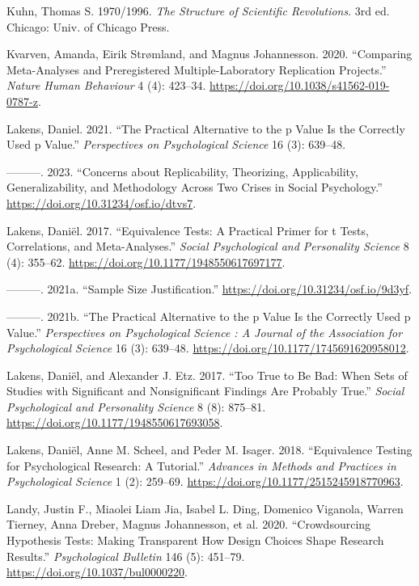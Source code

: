 \documentclass[
  letterpaper,
  DIV=11,
  numbers=noendperiod]{scrreprt}
\newlength{\cslhangindent}
\newenvironment{CSLReferences}[2] %
 {\begin{list}{}{%
  \setlength{\itemindent}{0pt}
  \setlength{\leftmargin}{0pt}
  \setlength{\parsep}{0pt}
  \ifodd #1
   \setlength{\leftmargin}{\cslhangindent}
   \setlength{\itemindent}{-1\cslhangindent}
  \fi
  \setlength{\itemsep}{#2\baselineskip}}}
 {\end{list}}
\begin{document}
\begin{CSLReferences}{1}{0}
Kuhn, Thomas S. 1970/1996. \emph{The Structure of Scientific
Revolutions}. 3rd ed. Chicago: {Univ. of Chicago Press}.

Kvarven, Amanda, Eirik Strømland, and Magnus Johannesson. 2020.
{``Comparing Meta-Analyses and Preregistered Multiple-Laboratory
Replication Projects.''} \emph{Nature Human Behaviour} 4 (4): 423--34.
\url{https://doi.org/10.1038/s41562-019-0787-z}.

Lakens, Daniel. 2021. {``The Practical Alternative to the p Value Is the
Correctly Used p Value.''} \emph{Perspectives on Psychological Science}
16 (3): 639--48.

---------. 2023. {``Concerns about Replicability, Theorizing,
Applicability, Generalizability, and Methodology Across Two Crises in
Social Psychology.''} \url{https://doi.org/10.31234/osf.io/dtvs7}.

Lakens, Daniël. 2017. {``Equivalence Tests: A Practical Primer for t
Tests, Correlations, and Meta-Analyses.''} \emph{Social Psychological
and Personality Science} 8 (4): 355--62.
\url{https://doi.org/10.1177/1948550617697177}.

---------. 2021a. {``Sample Size Justification.''}
\url{https://doi.org/10.31234/osf.io/9d3yf}.

---------. 2021b. {``The Practical Alternative to the p Value Is the
Correctly Used p Value.''} \emph{Perspectives on Psychological Science :
A Journal of the Association for Psychological Science} 16 (3): 639--48.
\url{https://doi.org/10.1177/1745691620958012}.

Lakens, Daniël, and Alexander J. Etz. 2017. {``Too True to Be Bad: When
Sets of Studies with Significant and Nonsignificant Findings Are
Probably True.''} \emph{Social Psychological and Personality Science} 8
(8): 875--81. \url{https://doi.org/10.1177/1948550617693058}.

Lakens, Daniël, Anne M. Scheel, and Peder M. Isager. 2018.
{``Equivalence Testing for Psychological Research: A Tutorial.''}
\emph{Advances in Methods and Practices in Psychological Science} 1 (2):
259--69. \url{https://doi.org/10.1177/2515245918770963}.

Landy, Justin F., Miaolei Liam Jia, Isabel L. Ding, Domenico Viganola,
Warren Tierney, Anna Dreber, Magnus Johannesson, et al. 2020.
{``Crowdsourcing Hypothesis Tests: Making Transparent How Design Choices
Shape Research Results.''} \emph{Psychological Bulletin} 146 (5):
451--79. \url{https://doi.org/10.1037/bul0000220}.


\end{CSLReferences}
\end{document}
